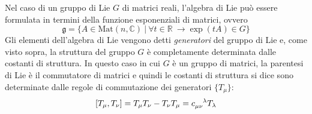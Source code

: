 Nel caso di un gruppo di Lie $G$ di matrici reali, l'algebra di Lie può essere
formulata in termini della funzione esponenziali di matrici, ovvero
$$
\mathfrak{g} = \{ A \in \mathrm{Mat}(n,\mathbb{C}) \: | \:
\forall t \in \mathbb{R} \:\to \exp (tA) \in G \}
$$
Gli elementi dell'algebra di Lie vengono detti \emph{generatori} del gruppo di Lie
e, come visto sopra, la struttura del gruppo $G$ è completamente determinata
dalle costanti di struttura. In questo caso in cui $G$ è un gruppo di matrici,
la parentesi di Lie è il commutatore di matrici e quindi le costanti di struttura
si dice sono determinate dalle regole di commutazione dei generatori $\{T_\mu\}$:
$$
   [T_\mu, T_\nu] = T_\mu T_\nu - T_\nu T_\mu
      = c_{\mu\nu}^{\hphantom{\mu\nu}\lambda} T_\lambda
$$
